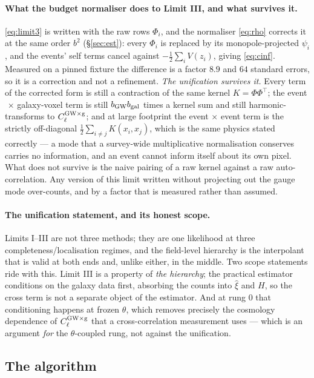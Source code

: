 \documentclass[11pt]{article}
\theoremstyle{definition}
\theoremstyle{remark}
\newcommand{\bgw}{b_{\rm GW}}
\newcommand{\bgal}{b_{\rm gal}}
\begin{document}
\paragraph{What the budget normaliser does to Limit III, and what survives it.}
\eqref{eq:limit3} is written with the raw rows $\Phi_i$, and the normaliser
\eqref{eq:rho} corrects it at the same order $b^2$ (\S\ref{sec:est}): every
$\Phi_i$ is replaced by its monopole-projected $\psi_i$, and the events' self
terms cancel against $-\tfrac12\sum_iV(z_i)$, giving \eqref{eq:cinf}. Measured on
a pinned fixture the difference is a factor $8.9$ and $64$ standard errors, so it
is a correction and not a refinement. \emph{The unification survives it.} Every
term of the corrected form is still a contraction of the same kernel
$K=\Phi\Phi^{\!\top}$; the event$\,\times\,$galaxy-voxel term is still $\bgw\bgal$
times a kernel sum and still harmonic-transforms to $C_\ell^{\rm GW\times g}$; and
at large footprint the event$\,\times\,$event term is the strictly off-diagonal
$\tfrac12\sum_{i\neq j}K(x_i,x_j)$, which is the same physics stated correctly ---
a mode that a survey-wide multiplicative normalisation conserves carries no
information, and an event cannot inform itself about its own pixel. What does not
survive is the naive pairing of a raw kernel against a raw auto-correlation. Any
version of this limit written without projecting out the gauge mode over-counts,
and by a factor that is measured rather than assumed.

\paragraph{The unification statement, and its honest scope.} Limits I--III are not
three methods; they are one likelihood at three completeness/localisation regimes,
and the field-level hierarchy is the interpolant that is valid at both ends and,
unlike either, in the middle. Two scope statements ride with this. Limit III is a
property of \emph{the hierarchy}; the practical estimator conditions on the galaxy
data first, absorbing the counts into $\hat\xi$ and $H$, so the cross term is not a
separate object of the estimator. And at rung 0 that conditioning happens at frozen
$\theta$, which removes precisely the cosmology dependence of
$C_\ell^{\rm GW\times g}$ that a cross-correlation measurement uses --- which is an
argument \emph{for} the $\theta$-coupled rung, not against the unification.

\subsection{The algorithm}
\end{document}
